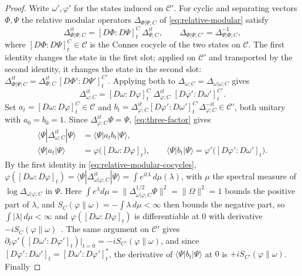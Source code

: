 \documentclass[a4paper,11pt]{article}
\theoremstyle{definition}
\newcommand{\nn}{\nonumber}
\begin{document}
\begin{proof}
Write $\omega',\varphi'$ for the states induced on $\mathcal C'$. For cyclic and separating vectors $\Phi,\Psi$ the relative modular operators $\Delta_{\Phi|\Psi;C}$ of \eqref{eq:relative-modular} satisfy~\cite{Araki1976,Araki1977}
\begin{equation}
 \Delta_{\Phi|\Psi;C}^{it}=[D\Phi:D\Psi]^{C}_t\,\Delta_{\Psi;C}^{it},
 \qquad
 \Delta_{\Phi|\Psi;C'}=\Delta_{\Psi|\Phi;C}^{-1},
 \label{eq:relative-modular-cocycles}
\end{equation}
where $[D\Phi:D\Psi]^{C}_t\in\mathcal C$ is the Connes cocycle of the two states on $\mathcal C$. The first identity changes the state in the first slot; applied on $\mathcal C'$ and transported by the second identity, it changes the state in the second slot: $\Delta_{\Phi|\Psi;C}^{it}=\Delta_{\Phi;C}^{it}\,[D\Phi':D\Psi']^{C'}_t$. Applying both to $\Delta_{\omega;C}=\Delta_{\omega|\omega;C}$ gives
\begin{equation}
 \Delta_{\omega;C}^{it}=[D\omega:D\varphi]^{C}_t\;\Delta_{\varphi;C}^{it}\;[D\varphi':D\omega']^{C'}_t .
 \label{eq:three-factor}
\end{equation}
Set $a_t=[D\omega:D\varphi]^{C}_t\in\mathcal C$ and $b_t=\Delta_{\varphi;C}^{it}[D\varphi':D\omega']^{C'}_t\Delta_{\varphi;C}^{-it}\in\mathcal C'$, both unitary with $a_0=b_0=1$. Since $\Delta_{\varphi;C}^{it}\Psi=\Psi$, \eqref{eq:three-factor} gives
\begin{align}
 \langle\Psi|\Delta_{\omega;C}^{it}|\Psi\rangle&=\langle\Psi|a_tb_t|\Psi\rangle,\nn\\
 \langle\Psi|a_t|\Psi\rangle&=\varphi\bigl([D\omega:D\varphi]_t\bigr),
 \qquad
 \langle\Psi|b_t|\Psi\rangle=\varphi'\bigl([D\varphi':D\omega']_t\bigr).
\end{align}
By the first identity in \eqref{eq:relative-modular-cocycles}, $\varphi([D\omega:D\varphi]_t)=\langle\Psi|\Delta_{\omega|\varphi;C}^{it}|\Psi\rangle=\int e^{it\lambda}\,d\mu(\lambda)$, with $\mu$ the spectral measure of $\log\Delta_{\omega|\varphi;C}$ in $\Psi$. Here $\int e^{\lambda}d\mu=\|\Delta_{\omega|\varphi;C}^{1/2}\Psi\|^2=\|\Omega\|^2=1$ bounds the positive part of $\lambda$, and $S_C(\varphi\|\omega)=-\int\lambda\,d\mu<\infty$ then bounds the negative part, so $\int|\lambda|\,d\mu<\infty$ and $\varphi([D\omega:D\varphi]_t)$ is differentiable at $0$ with derivative $-iS_C(\varphi\|\omega)$~\cite{OhyaPetz1993}. The same argument on $\mathcal C'$ gives $\partial_t\varphi'([D\omega':D\varphi']_t)|_{t=0}=-iS_{C'}(\varphi\|\omega)$, and since $[D\varphi':D\omega']_t=[D\omega':D\varphi']_t^*$, the derivative of $\langle\Psi|b_t|\Psi\rangle$ at $0$ is $+iS_{C'}(\varphi\|\omega)$. Finally

\end{proof}
\end{document}
